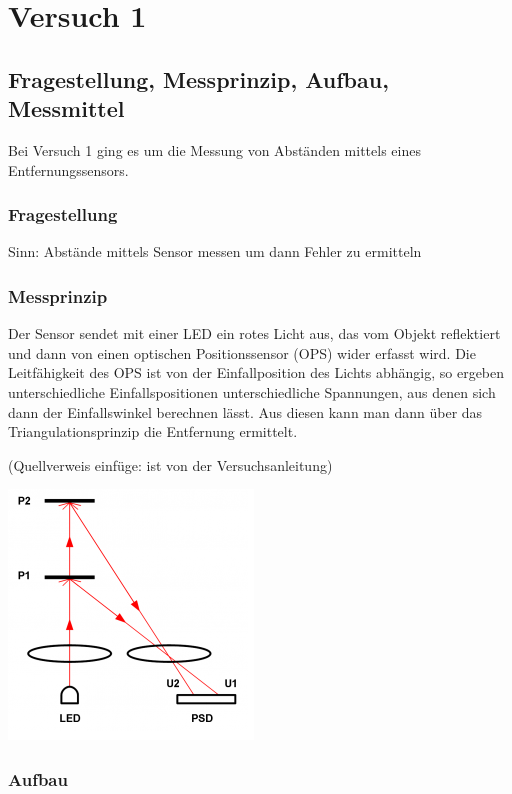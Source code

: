 \chapter{Versuch 1}
\label{chap:VERSUCH_1}

\section{Fragestellung, Messprinzip, Aufbau, Messmittel}
\label{chap:VERSUCH_1_FRAGESTELLUNG}

Bei Versuch 1 ging es um die Messung von Abständen mittels eines Entfernungssensors. 

\subsection*{Fragestellung}

	Sinn: Abstände mittels Sensor messen um dann Fehler zu ermitteln
\subsection*{Messprinzip}
	Der Sensor sendet mit einer LED ein rotes Licht aus, das vom Objekt reflektiert und dann von einen optischen Positionssensor (OPS) wider erfasst wird. Die Leitfähigkeit des OPS ist von der Einfallposition des Lichts abhängig, so ergeben unterschiedliche Einfallspositionen unterschiedliche Spannungen, aus denen sich dann der Einfallswinkel berechnen lässt. Aus diesen kann man dann über das Triangulationsprinzip die Entfernung ermittelt.
	
	(Quellverweis einfüge: ist von der Versuchsanleitung)
	\begin{center}
	\includegraphics[scale=1]{media/triangulationGraphik.png}
	\label{Triangulation}
	\end{center}
	
	
\subsection*{Aufbau}

